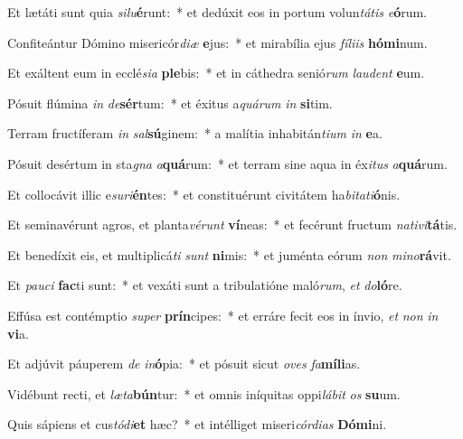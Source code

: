 \item Et lætáti sunt quia \textit{si}\textit{lu}\textbf{é}runt:~* et dedúxit eos in portum volun\textit{tá}\textit{tis} \textit{e}\textbf{ó}rum.
\item Confiteántur Dómino misericór\textit{di}\textit{æ} \textbf{e}jus:~* et mirabília ejus \textit{fí}\textit{li}\textit{is} \textbf{hó}\textbf{mi}num.
\item Et exáltent eum in ecclé\textit{si}\textit{a} \textbf{ple}bis:~* et in cáthedra senió\textit{rum} \textit{lau}\textit{dent} \textbf{e}um.
\item Pósuit flúmina \textit{in} \textit{de}\textbf{sér}tum:~* et éxitus a\textit{quá}\textit{rum} \textit{in} \textbf{si}tim.
\item Terram fructíferam \textit{in} \textit{sal}\textbf{sú}ginem:~* a malítia inhabitán\textit{ti}\textit{um} \textit{in} \textbf{e}a.
\item Pósuit desértum in sta\textit{gna} \textit{a}\textbf{quá}rum:~* et terram sine aqua in éx\textit{i}\textit{tus} \textit{a}\textbf{quá}rum.
\item Et collocávit illic e\textit{su}\textit{ri}\textbf{én}tes:~* et constituérunt civitátem ha\textit{bi}\textit{ta}\textit{ti}\textbf{ó}nis.
\item Et seminavérunt agros, et planta\textit{vé}\textit{runt} \textbf{ví}neas:~* et fecérunt fructum \textit{na}\textit{ti}\textit{vi}\textbf{tá}tis.
\item Et benedíxit eis, et multiplicá\textit{ti} \textit{sunt} \textbf{ni}mis:~* et juménta eórum \textit{non} \textit{mi}\textit{no}\textbf{rá}vit.
\item Et \textit{pau}\textit{ci} \textbf{fac}ti sunt:~* et vexáti sunt a tribulatióne maló\textit{rum}, \textit{et} \textit{do}\textbf{ló}re.
\item Effúsa est contémptio \textit{su}\textit{per} \textbf{prín}cipes:~* et erráre fecit eos in ínvio, \textit{et} \textit{non} \textit{in} \textbf{vi}a.
\item Et adjúvit páuperem \textit{de} \textit{in}\textbf{ó}pia:~* et pósuit sicut \textit{o}\textit{ves} \textit{fa}\textbf{mí}\textbf{li}as.
\item Vidébunt recti, et \textit{læ}\textit{ta}\textbf{bún}tur:~* et omnis iníquitas oppi\textit{lá}\textit{bit} \textit{os} \textbf{su}um.
\item Quis sápiens et cus\textit{tó}\textit{di}\textbf{et} hæc?~* et intélliget miseri\textit{cór}\textit{di}\textit{as} \textbf{Dó}\textbf{mi}ni.
